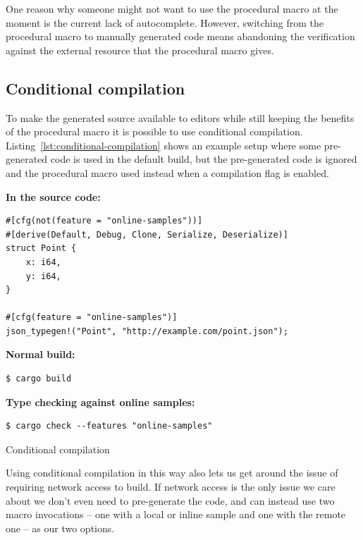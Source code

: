 One reason why someone might not want to use the procedural macro at the moment is the current lack of autocomplete. However, switching from the procedural macro to manually generated code means abandoning the verification against the external resource that the procedural macro gives.

\subsection{Conditional compilation}


To make the generated source available to editors while still keeping the benefits of the procedural macro it is possible to use conditional compilation. Listing~\ref{lst:conditional-compilation} shows an example setup where some pre-generated code is used in the default build, but the pre-generated code is ignored and the procedural macro used instead when a compilation flag is enabled.

\begin{listing}[ht!]
\textbf{In the source code:}
\begin{verbatim}
#[cfg(not(feature = "online-samples"))]
#[derive(Default, Debug, Clone, Serialize, Deserialize)]
struct Point {
    x: i64,
    y: i64,
}

#[cfg(feature = "online-samples")]
json_typegen!("Point", "http://example.com/point.json");
\end{verbatim}
\vspace{5mm}

\textbf{Normal build:}
\begin{verbatim}
$ cargo build
\end{verbatim}
\vspace{5mm}

\textbf{Type checking against online samples:}
\begin{verbatim}
$ cargo check --features "online-samples"
\end{verbatim}
\caption{Conditional compilation}
\label{lst:conditional-compilation}
\end{listing}

Using conditional compilation in this way also lets us get around the issue of requiring network access to build. If network access is the only issue we care about we don't even need to pre-generate the code, and can instead use two macro invocations -- one with a local or inline sample and one with the remote one -- as our two options.

